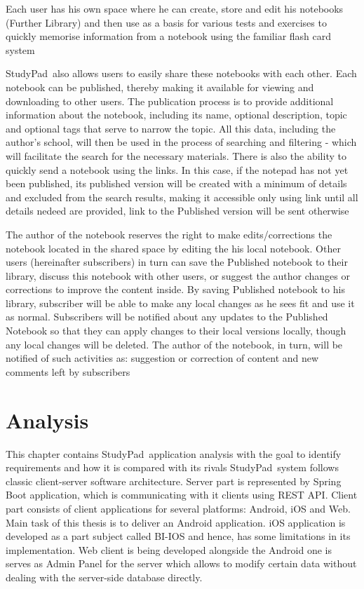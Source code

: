 \documentclass[thesis=B,english]{FITthesis}[2012/10/20]
\newcommand{\appname}{StudyPad}
\begin{document}
Each user has his own space where he can create, store and edit his notebooks (Further Library) and then use as a basis for various tests and exercises to quickly memorise information from a notebook using the familiar flash card system

\appname\ also allows users to easily share these notebooks with each other. Each notebook can be published, thereby making it available for viewing and downloading to other users.
The publication process is to provide additional information about the notebook, including its name, optional description, topic and optional tags that serve to narrow the topic. All this data, including the author's school, will then be used in the process of searching and filtering - which will facilitate the search for the necessary materials. There is also the ability to quickly send a notebook using the links. In this case, if the notepad has not yet been published, its published version will be created with a minimum of details and excluded from the search results, making it accessible only using link until all details nedeed are provided, link to the Published version will be sent otherwise


The author of the notebook reserves the right to make edits/corrections the notebook located in the shared space by editing the his local notebook. Other users (hereinafter subscribers) in turn can save the Published notebook to their library, discuss this notebook with other users, or suggest the author changes or corrections to improve the content inside. By saving Published notebook to his library, subscriber will be able to make any local changes as he sees fit and use it as normal. Subscribers will be notified about any updates to the Published Notebook so that they can apply changes to their local versions locally, though any local changes will be deleted. The author of the notebook, in turn, will be notified of such activities as: suggestion or correction of content and new comments left by subscribers

\chapter{Analysis}
This chapter contains \appname\ application analysis with the goal to identify requirements and how it is compared with its rivals \appname\ system follows classic client-server software architecture. Server part is represented by Spring Boot application, which is communicating with it clients using REST API. Client part consists of client applications for several platforms: Android, iOS and Web. Main task of this thesis is to deliver an Android application. iOS application is developed as a part subject called BI-IOS and hence, has some limitations in its implementation. Web client is being developed alongside the Android one is serves as Admin Panel for the server which allows to modify certain data without dealing with the server-side database directly. 
\end{document}
